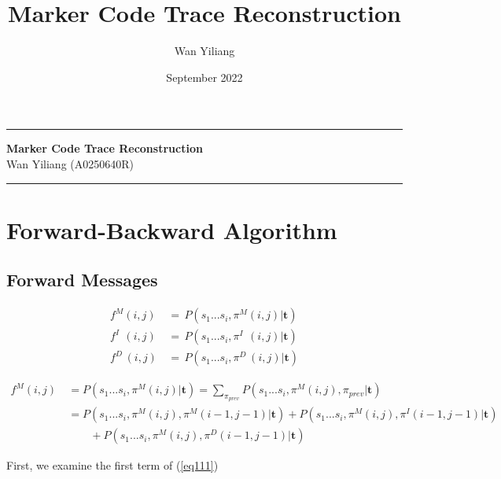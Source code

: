 \documentclass[10pt]{article}
\title{Marker Code Trace Reconstruction}
\author{Wan Yiliang}
\date{September 2022}
\begin{document}
\begin{center}
\hrule
\vspace{.4cm}
{\bf {\Huge Marker Code Trace Reconstruction}}
\vspace{.2cm} \\
Wan Yiliang  (A0250640R) 
\end{center}
\vspace{.1cm}
\hrule

\section{Forward-Backward Algorithm}

  \subsection{Forward Messages}

    \begin{equation}
    \begin{aligned}
      f^{M}(i, j) \,&=\, P(s_1...s_i, \pi^M(i, j) | \mathbf{t}) \\
      f^{I\;\;}(i, j) \,&=\, P(s_1...s_i, \pi^{I\;\;}(i, j) | \mathbf{t}) \\
      f^{D\;}(i, j) \,&=\, P(s_1...s_i, \pi^{D\;}(i, j) | \mathbf{t})
    \end{aligned}
    \end{equation}

    \begin{equation} \label{eq111}
    \begin{aligned}
      f^{M}(i, j) \
        &= P(s_1...s_i, \pi^M(i, j) | \mathbf{t}) = \sum\nolimits_{\pi_{prev}} P(s_1...s_i, \pi^M(i, j), \pi_{prev} | \mathbf{t}) \\
        &= P(s_1...s_i, \pi^M(i, j), \pi^M(i-1, j-1) | \mathbf{t}) + P( s_1...s_i, \pi^M(i, j), \pi^{I}(i-1, j-1) | \mathbf{t})  \\
        &\qquad + P(s_1...s_i, \pi^M(i, j), \pi^{D}(i-1, j-1) | \mathbf{t})
    \end{aligned}
    \end{equation}

    First, we examine the first term of (\ref{eq111})
\end{document}
